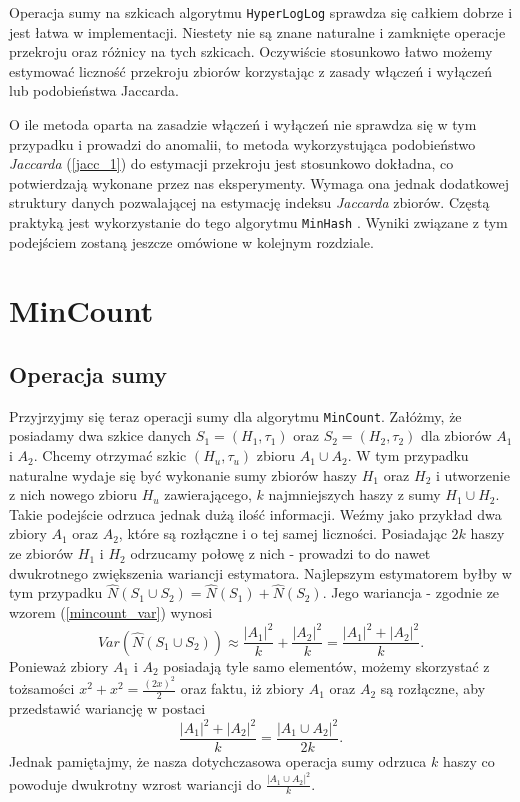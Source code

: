 Operacja sumy na szkicach algorytmu \texttt{HyperLogLog} sprawdza się całkiem dobrze i jest  łatwa w implementacji. Niestety nie są znane naturalne i zamknięte operacje przekroju oraz różnicy na tych szkicach. Oczywiście stosunkowo łatwo możemy estymować liczność przekroju zbiorów korzystając z zasady włączeń i wyłączeń lub podobieństwa Jaccarda.

O ile metoda oparta na zasadzie włączeń i wyłączeń nie sprawdza się w tym przypadku i prowadzi do anomalii, to metoda wykorzystująca podobieństwo \textit{Jaccarda} (\ref{jacc_1}) do estymacji przekroju jest stosunkowo dokładna, co potwierdzają wykonane przez nas eksperymenty. Wymaga ona jednak dodatkowej struktury danych pozwalającej na estymację indeksu \textit{Jaccarda} zbiorów. Częstą praktyką jest wykorzystanie do tego algorytmu \texttt{MinHash} \cite{adroll}. Wyniki związane z tym podejściem zostaną jeszcze omówione w kolejnym rozdziale.


\section{MinCount}
\label{impr_mincount}

\subsection{Operacja sumy}
\label{impr_sum}

Przyjrzyjmy się teraz operacji sumy dla algorytmu \texttt{MinCount}. Załóżmy, że posiadamy dwa szkice danych $S_1 = (H_1, {\tau}_1)$ oraz $S_2 = (H_2, {\tau}_2)$ dla zbiorów $A_1$ i $A_2$. Chcemy otrzymać szkic $(H_u, {\tau}_u)$ zbioru $A_1 \cup A_2$. W tym przypadku naturalne wydaje się być wykonanie sumy zbiorów haszy $H_1$ oraz $H_2$ i utworzenie z nich nowego zbioru $H_u$ zawierającego, $k$ najmniejszych haszy z sumy $H_1 \cup H_2$. Takie podejście  odrzuca jednak dużą ilość informacji. Weźmy jako przykład dwa zbiory $A_1$ oraz $A_2$, które są rozłączne i o tej samej liczności.
Posiadając $2k$ haszy ze zbiorów $H_1$ i $H_2$ odrzucamy połowę z nich - prowadzi to do nawet dwukrotnego zwiększenia wariancji estymatora. 
 Najlepszym estymatorem byłby w tym przypadku $\hat{N}(S_1 \cup S_2) = \hat{N}(S_1) + \hat{N}(S_2)$. Jego wariancja - zgodnie ze wzorem (\ref{mincount_var}) wynosi $$Var(\hat{N}(S_1 \cup S_2)) \approx \frac{|A_1|^2}{k} + \frac{|A_2|^2}{k} = \frac{|A_1|^2 + |A_2|^2}{k}.$$ Ponieważ zbiory $A_1$ i $A_2$ posiadają tyle samo elementów, możemy skorzystać z tożsamości $x^2 + x^2  = \frac{(2x)^2}{2}$ oraz faktu, iż zbiory $A_1$ oraz $A_2$ są rozłączne, aby przedstawić wariancję w postaci $$\frac{|A_1|^2 + |A_2|^2}{k} = \frac{|A_1 \cup A_2|^2}{2k}.$$ Jednak pamiętajmy, że nasza dotychczasowa operacja sumy odrzuca $k$ haszy co powoduje dwukrotny wzrost wariancji do $\frac{|A_1 \cup A_2|^2}{k}$.

